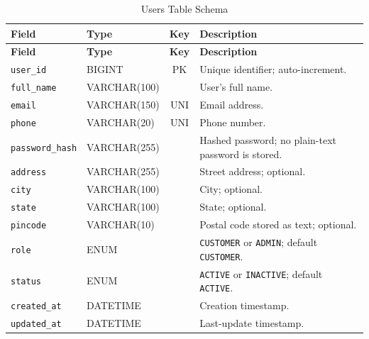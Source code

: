 \documentclass[10pt,a4paper]{report}
\newcommand{\col}[1]{\texttt{#1}}
\begin{document}
{\small
\begin{longtable}{@{}llc>{\raggedright\arraybackslash}p{6.6cm}@{}}
\caption{Users Table Schema}\label{tab:users}\\
\toprule \textbf{Field} & \textbf{Type} & \textbf{Key} & \textbf{Description}\\ \midrule \endfirsthead
\toprule \textbf{Field} & \textbf{Type} & \textbf{Key} & \textbf{Description}\\ \midrule \endhead
\bottomrule \endfoot
\col{user_id} & BIGINT & PK & Unique identifier; auto-increment.\\
\col{full_name} & VARCHAR(100) & & User's full name.\\
\col{email} & VARCHAR(150) & UNI & Email address.\\
\col{phone} & VARCHAR(20) & UNI & Phone number.\\
\col{password_hash} & VARCHAR(255) & & Hashed password; no plain-text password is stored.\\
\col{address} & VARCHAR(255) & & Street address; optional.\\
\col{city} & VARCHAR(100) & & City; optional.\\
\col{state} & VARCHAR(100) & & State; optional.\\
\col{pincode} & VARCHAR(10) & & Postal code stored as text; optional.\\
\col{role} & ENUM & & \col{CUSTOMER} or \col{ADMIN}; default \col{CUSTOMER}.\\
\col{status} & ENUM & & \col{ACTIVE} or \col{INACTIVE}; default \col{ACTIVE}.\\
\col{created_at} & DATETIME & & Creation timestamp.\\
\col{updated_at} & DATETIME & & Last-update timestamp.\\
\end{longtable}

}
\end{document}
